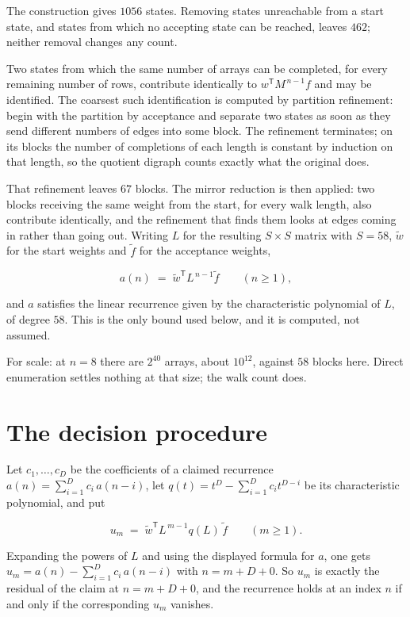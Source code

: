 \documentclass[11pt]{article}
\theoremstyle{definition}
\begin{document}
The construction gives $1056$ states. Removing states unreachable from a start state, and states from which no accepting state can be reached, leaves $462$; neither removal changes any count.

Two states from which the same number of arrays can be completed, for every remaining number of rows, contribute identically to $w^{\mathsf T}M^{\,n-1}f$ and may be identified. The coarsest such identification is computed by partition refinement: begin with the partition by acceptance and separate two states as soon as they send different numbers of edges into some block. The refinement terminates; on its blocks the number of completions of each length is constant by induction on that length, so the quotient digraph counts exactly what the original does.

That refinement leaves $67$ blocks. The mirror reduction is then applied: two blocks receiving the same weight from the start, for every walk length, also contribute identically, and the refinement that finds them looks at edges coming in rather than going out. Writing $L$ for the resulting $S \times S$ matrix with $S = 58$, $\tilde w$ for the start weights and $\tilde f$ for the acceptance weights,

\[a(n) \;=\; \tilde w^{\mathsf T} L^{\,n-1} \tilde f \qquad (n \ge 1),\]

and $a$ satisfies the linear recurrence given by the characteristic polynomial of $L$, of degree $58$. This is the only bound used below, and it is computed, not assumed.

For scale: at $n = 8$ there are $2^{40}$ arrays, about $10^{12}$, against $58$ blocks here. Direct enumeration settles nothing at that size; the walk count does.

\section{The decision procedure}

Let $c_1,\dots,c_D$ be the coefficients of a claimed recurrence $a(n) = \sum_{i=1}^{D} c_i\,a(n-i)$, let $q(t) = t^{D} - \sum_{i=1}^{D} c_i t^{D-i}$ be its characteristic polynomial, and put

\[u_m \;=\; \tilde w^{\mathsf T} L^{\,m-1} q(L)\,\tilde f \qquad (m \ge 1).\]

Expanding the powers of $L$ and using the displayed formula for $a$, one gets $u_m = a(n) - \sum_{i=1}^{D} c_i\,a(n-i)$ with $n = m + D + 0$. So $u_m$ is exactly the residual of the claim at $n = m + D + 0$, and the recurrence holds at an index $n$ if and only if the corresponding $u_m$ vanishes.
\end{document}
